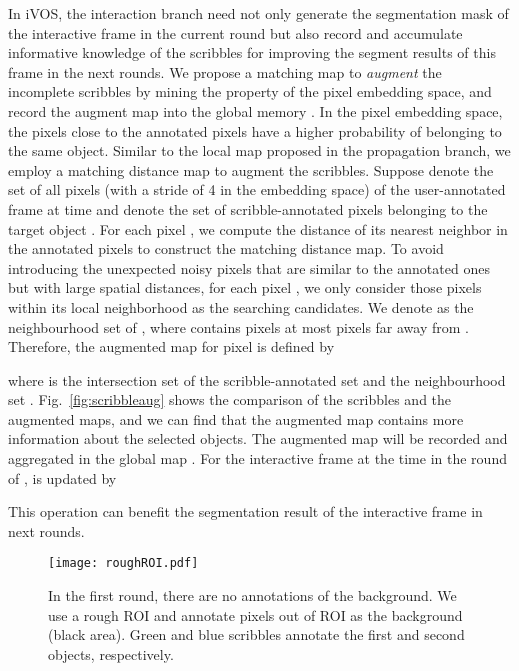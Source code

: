 \documentclass[10pt,twocolumn,letterpaper]{article}
\begin{document}
In iVOS, the interaction branch need not only generate the segmentation mask of the interactive frame in the current round but also record and accumulate informative knowledge of the scribbles for improving the segment results of this frame in the next rounds.
We propose a matching map to \emph{augment} the incomplete scribbles by mining the property of the pixel embedding space, and record the augment map into the global memory . 
In the pixel embedding space, the pixels close to the annotated pixels have a higher probability of belonging to the same object.
Similar to the local map proposed in the propagation branch, we employ a matching distance map to augment the scribbles. Suppose  denote the set of all pixels (with a stride of 4 in the embedding space) of the user-annotated frame at time  and  denote the set of scribble-annotated pixels belonging to the target object .
For each pixel , we compute the distance of its nearest neighbor in the annotated pixels  to construct the matching distance map.
To avoid introducing the unexpected noisy pixels that are similar to the annotated ones but with large spatial distances, for each pixel , we only consider those pixels within its local neighborhood as the searching candidates. 
We denote  as the neighbourhood set of , where  contains pixels at most  pixels far away from . 
Therefore, the augmented map  for pixel  is defined by

\vspace{-4mm}

where  is the intersection set of the scribble-annotated set  and the neighbourhood set .
Fig.~\ref{fig:scribbleaug} shows the comparison of the scribbles and the augmented maps, and we can find that the augmented map contains more information about the selected objects. The augmented map  will be recorded and aggregated in the global map . For the interactive frame at the time  in the round of ,  is updated by

This operation can benefit the segmentation result of the interactive frame in next rounds.


 


\begin{figure}[t]
\texttt{[image: roughROI.pdf]}
\centering
\caption{In the first round, there are no annotations of the background. We use a rough ROI and annotate pixels out of ROI as the background (black area). Green and blue scribbles annotate the first and second objects, respectively.}
\vspace{-1em}
\label{fig:roughROI}
\end{figure}
\end{document}
